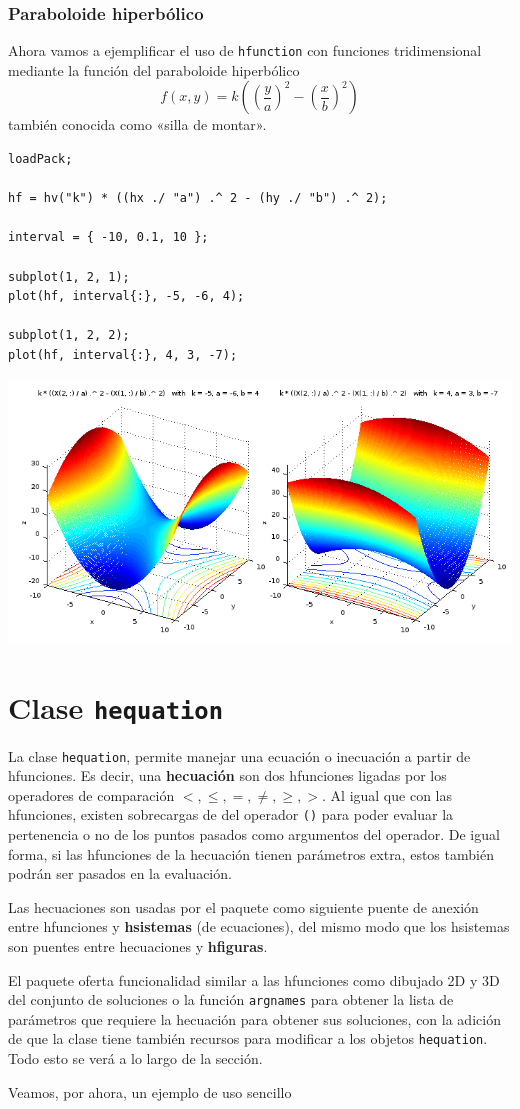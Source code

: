 \documentclass{article}
\begin{document}
\subsubsection{Paraboloide hiperbólico}
Ahora vamos a ejemplificar el uso de \texttt{hfunction} con funciones
tridimensional mediante la función del paraboloide hiperbólico \[
f(x, y) = k\left(\left(\frac{y}{a}\right)^2 - \left(\frac{x}{b}\right) ^ 2\right) \]
también conocida como «silla de montar».

\begin{verbatim}
loadPack;

hf = hv("k") * ((hx ./ "a") .^ 2 - (hy ./ "b") .^ 2);

interval = { -10, 0.1, 10 };

subplot(1, 2, 1);
plot(hf, interval{:}, -5, -6, 4);

subplot(1, 2, 2);
plot(hf, interval{:}, 4, 3, -7);
\end{verbatim}

\begin{center}
\includegraphics[scale=0.5]{figure4.png}
\end{center}

\section{Clase \texttt{hequation}}
\label{sec:heq}
La clase \texttt{hequation}, permite manejar una ecuación o inecuación
a partir de hfunciones. Es decir, una \textbf{hecuación} son dos
hfunciones ligadas por los operadores de comparación $<, \leq, =,
\neq, \geq, >$. Al igual que con las hfunciones, existen sobrecargas
de del operador \texttt{()} para poder evaluar la pertenencia o no de
los puntos pasados como argumentos del operador. De igual forma, si
las hfunciones de la hecuación tienen parámetros extra, estos también
podrán ser pasados en la evaluación.

Las hecuaciones son usadas por el paquete como siguiente puente de
anexión entre hfunciones y \textbf{hsistemas} (de ecuaciones), del mismo modo
que los hsistemas son puentes entre hecuaciones y \textbf{hfiguras}.

El paquete oferta funcionalidad similar a las hfunciones como
dibujado 2D y 3D del conjunto de soluciones o la función
\texttt{argnames} para obtener la lista de parámetros que requiere la
hecuación para obtener sus soluciones, con la adición de que la
clase tiene también recursos para modificar a los objetos
\texttt{hequation}. Todo esto se verá a lo largo de la sección.

Veamos, por ahora, un ejemplo de uso sencillo
\end{document}
